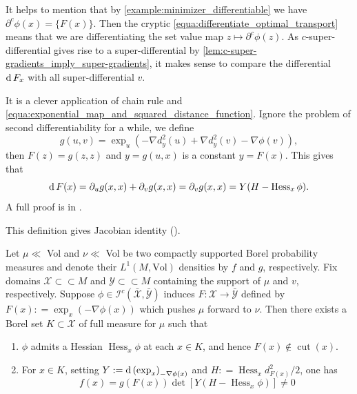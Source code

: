 It helps to mention that by \cref{example:minimizer_differentiable} we have
$\partial^c \phi (x) = \{ F(x) \}$.
Then the cryptic \cref{equa:differentiate_optimal_transport} means that we are differentiating
the set value map $z \mapsto \partial^c \phi(z)$.
As $c$-super-differential gives rise to a super-differential by \cref{lem:c-super-gradients_imply_super-gradients},
it makes sense to compare the differential $\operatorname{d} F_x$ with all super-differential $v$.
\begin{rmk}

	It is a clever application of chain rule and \cref{equa:exponential_map_and_squared_distance_function}.
	Ignore the problem of second differentiability for a while, we define
	\[
		g(u,v) = \exp_{u}(-\nabla d_y^2(u) + \nabla d_y^2(v) - \nabla \phi (v)),
	\]
	then $F(z) = g(z, z)$ and $ y = g(u, x) $ is a constant $y = F(x)$.
	This gives that
	\[
		\operatorname{d} F(x) = \partial_u g(x, x) + \partial_v g(x, x) = \partial_v g(x, x) = Y(H - \operatorname{Hess}_x \phi).
	\]
	A full proof is in \cite[Proposition 4.1]{cordero2001riemannian}.
\end{rmk}

This definition gives Jacobian identity (\cite[Theorem 4.2]{cordero2001riemannian}).

\begin{thm}
	\label{thm:jacobian_identity}
	Let \( \mu \ll \) Vol and \( \nu \ll \) Vol be
	two compactly supported Borel probability measures and denote their
	\( L ^ { 1 } ( M, \text{Vol}) \) densities by \( f \) and \( g \), respectively.
	Fix domains \( \mathcal{X} \subset \subset M \) and \( \mathcal{Y} \subset \subset M \) containing the support of \( \mu \) and \( v \), respectively.
	Suppose \( \phi \in \mathcal{I} ^ { c } ( \bar { \mathcal{X} } , \bar { \mathcal{Y} } ) \) induces
	\( F : \mathcal{X} \rightarrow \bar { \mathcal{Y} } \) defined by \( F ( x ) : = \exp _ { x } ( - \nabla \phi ( x ) ) \)
	which pushes \( \mu \) forward to $\nu$.
	Then there exists a Borel set \( K \subset \mathcal{X} \) of full
	measure for \( \mu \) such that
	\begin{enumerate}
		\item $\phi$ admits a Hessian \( \operatorname { Hess } _ { x } \phi \) at each \( x \in K \), and hence \( F ( x ) \notin \operatorname { cut } ( x ) \).
		\item For \( x \in K \), setting \( Y : = \operatorname{d} \left( \exp _ { x } \right) _ { - \nabla \phi ( x ) } \) and \( H : = \operatorname { Hess } _ { x } d _ { F ( x ) } ^ { 2 } / 2 \), one
		      has
		      \[ f ( x ) = g ( F ( x ) ) \operatorname { det } \left[ Y \left( H - \operatorname { Hess } _ { x } \phi \right) \right] \neq 0 \]
	\end{enumerate}
\end{thm}

